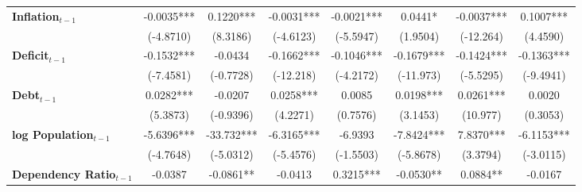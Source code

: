 \begin{center}
\begin{tabular}{lccccccc}
\textbf{Inflation$_{t-1}$}      &      -0.0035***      &          0.1220***          &          -0.0031***          &              -0.0021***             &             0.0441*              &          -0.0037***         &           0.1007***            \\
\textbf{ }                         &      (-4.8710)       &           (8.3186)          &          (-4.6123)           &              (-5.5947)              &             (1.9504)             &          (-12.264)          &            (4.4590)            \\
\textbf{Deficit$_{t-1}$}             &      -0.1532***      &           -0.0434           &          -0.1662***          &              -0.1046***             &            -0.1679***            &          -0.1424***         &           -0.1363***           \\
\textbf{ }                         &      (-7.4581)       &          (-0.7728)          &          (-12.218)           &              (-4.2172)              &            (-11.973)             &          (-5.5295)          &           (-9.4941)            \\
\textbf{Debt$_{t-1}$}                &      0.0282***       &           -0.0207           &          0.0258***           &                0.0085               &            0.0198***             &          0.0261***          &             0.0020             \\
\textbf{ }                         &       (5.3873)       &          (-0.9396)          &           (4.2271)           &               (0.7576)              &             (3.1453)             &           (10.977)          &            (0.3053)            \\
\textbf{log Population$_{t-1}$}      &      -5.6396***      &          -33.732***         &          -6.3165***          &               -6.9393               &            -7.8424***            &          7.8370***          &           -6.1153***           \\
\textbf{ }                         &      (-4.7648)       &          (-5.0312)          &          (-5.4576)           &              (-1.5503)              &            (-5.8678)             &           (3.3794)          &           (-3.0115)            \\
\textbf{Dependency Ratio$_{t-1}$}   &       -0.0387        &          -0.0861**          &           -0.0413            &              0.3215***              &            -0.0530**             &           0.0884**          &            -0.0167             \\

\end{tabular}
\end{center}
